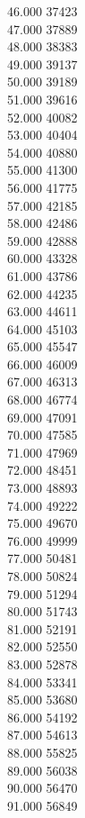 { 46.000	37423 \\
 47.000	37889 \\
 48.000	38383 \\
 49.000	39137 \\
 50.000	39189 \\
 51.000	39616 \\
 52.000	40082 \\
 53.000	40404 \\
 54.000	40880 \\
 55.000	41300 \\
 56.000	41775 \\
 57.000	42185 \\
 58.000	42486 \\
 59.000	42888 \\
 60.000	43328 \\
 61.000	43786 \\
 62.000	44235 \\
 63.000	44611 \\
 64.000	45103 \\
 65.000	45547 \\
 66.000	46009 \\
 67.000	46313 \\
 68.000	46774 \\
 69.000	47091 \\
 70.000	47585 \\
 71.000	47969 \\
 72.000	48451 \\
 73.000	48893 \\
 74.000	49222 \\
 75.000	49670 \\
 76.000	49999 \\
 77.000	50481 \\
 78.000	50824 \\
 79.000	51294 \\
 80.000	51743 \\
 81.000	52191 \\
 82.000	52550 \\
 83.000	52878 \\
 84.000	53341 \\
 85.000	53680 \\
 86.000	54192 \\
 87.000	54613 \\
 88.000	55825 \\
 89.000	56038 \\
 90.000	56470 \\
 91.000	56849 \\
}
